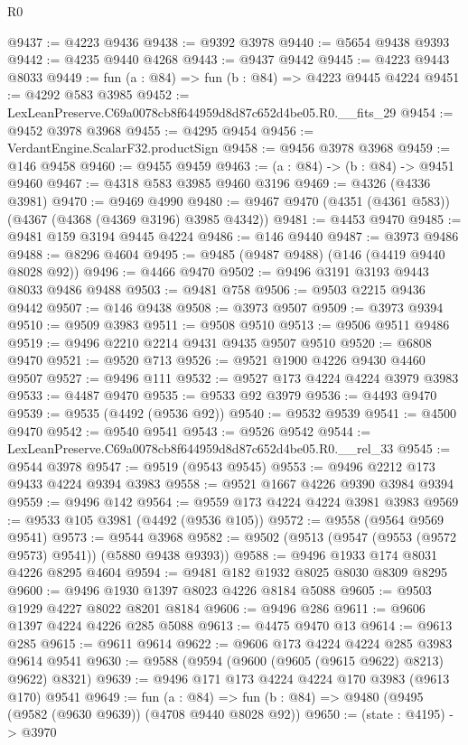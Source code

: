 \begin{lexlean}{R0}
\begin{coremodule}
@9437 := @4223 @9436
@9438 := @9392 @3978
@9440 := @5654 @9438 @9393
@9442 := @4235 @9440 @4268
@9443 := @9437 @9442
@9445 := @4223 @9443 @8033
@9449 := fun (a : @84) => fun (b : @84) => @4223 @9445 @4224
@9451 := @4292 @583 @3985
@9452 := LexLeanPreserve.C69a0078cb8f644959d8d87c652d4be05.R0.__fits_29
@9454 := @9452 @3978 @3968
@9455 := @4295 @9454
@9456 := VerdantEngine.ScalarF32.productSign
@9458 := @9456 @3978 @3968
@9459 := @146 @9458
@9460 := @9455 @9459
@9463 := (a : @84) -> (b : @84) -> @9451 @9460
@9467 := @4318 @583 @3985 @9460 @3196
@9469 := @4326 (@4336 @3981)
@9470 := @9469 @4990
@9480 := @9467 @9470 (@4351 (@4361 @583)) (@4367 (@4368 (@4369 @3196) @3985 @4342))
@9481 := @4453 @9470
@9485 := @9481 @159 @3194 @9445 @4224
@9486 := @146 @9440
@9487 := @3973 @9486
@9488 := @8296 @4604
@9495 := @9485 (@9487 @9488) (@146 (@4419 @9440 @8028 @92))
@9496 := @4466 @9470
@9502 := @9496 @3191 @3193 @9443 @8033 @9486 @9488
@9503 := @9481 @758
@9506 := @9503 @2215 @9436 @9442
@9507 := @146 @9438
@9508 := @3973 @9507
@9509 := @3973 @9394
@9510 := @9509 @3983
@9511 := @9508 @9510
@9513 := @9506 @9511 @9486
@9519 := @9496 @2210 @2214 @9431 @9435 @9507 @9510
@9520 := @6808 @9470
@9521 := @9520 @713
@9526 := @9521 @1900 @4226 @9430 @4460 @9507
@9527 := @9496 @111
@9532 := @9527 @173 @4224 @4224 @3979 @3983
@9533 := @4487 @9470
@9535 := @9533 @92 @3979
@9536 := @4493 @9470
@9539 := @9535 (@4492 (@9536 @92))
@9540 := @9532 @9539
@9541 := @4500 @9470
@9542 := @9540 @9541
@9543 := @9526 @9542
@9544 := LexLeanPreserve.C69a0078cb8f644959d8d87c652d4be05.R0.__rel_33
@9545 := @9544 @3978
@9547 := @9519 (@9543 @9545)
@9553 := @9496 @2212 @173 @9433 @4224 @9394 @3983
@9558 := @9521 @1667 @4226 @9390 @3984 @9394
@9559 := @9496 @142
@9564 := @9559 @173 @4224 @4224 @3981 @3983
@9569 := @9533 @105 @3981 (@4492 (@9536 @105))
@9572 := @9558 (@9564 @9569 @9541)
@9573 := @9544 @3968
@9582 := @9502 (@9513 (@9547 (@9553 (@9572 @9573) @9541)) (@5880 @9438 @9393))
@9588 := @9496 @1933 @174 @8031 @4226 @8295 @4604
@9594 := @9481 @182 @1932 @8025 @8030 @8309 @8295
@9600 := @9496 @1930 @1397 @8023 @4226 @8184 @5088
@9605 := @9503 @1929 @4227 @8022 @8201 @8184
@9606 := @9496 @286
@9611 := @9606 @1397 @4224 @4226 @285 @5088
@9613 := @4475 @9470 @13
@9614 := @9613 @285
@9615 := @9611 @9614
@9622 := @9606 @173 @4224 @4224 @285 @3983 @9614 @9541
@9630 := @9588 (@9594 (@9600 (@9605 (@9615 @9622) @8213) @9622) @8321)
@9639 := @9496 @171 @173 @4224 @4224 @170 @3983 (@9613 @170) @9541
@9649 := fun (a : @84) =>
  fun (b : @84) => @9480 (@9495 (@9582 (@9630 @9639)) (@4708 @9440 @8028 @92))
@9650 := (state : @4195) -> @3970

\end{coremodule}
\end{lexlean}
